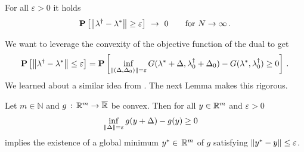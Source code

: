\begin{theorem}
  \label{bw:cd:th}
  For all
  $\varepsilon>0$ it holds
  \begin{gather}
    \P
    \left[ 
    \norm{
      \lambda^\dagger
      -
      \lambda^*
    }
    \ge
    \varepsilon
    \right]
    \ 
    \to
    \ 
    0
    \qquad
    \text{for}\ 
    N
    \to 
    \infty
    \,.
  \end{gather}
\end{theorem}
We want to leverage the convexity of
the objective function of the dual to get
 \begin{gather*}
   \mathbf{P}
   \left[ 
     \left\lVert
      \lambda ^ \dagger
      -
      \lambda^*
     \right\rVert
     \le
     \varepsilon
   \right]
   =
   \mathbf{P}
   \left[ 
     \inf _ { 
       \left\lVert
         (
     \Delta
     ,
     \Delta_0
         )
 \right\rVert 
= \varepsilon }
     G
     (
     \lambda^*
      +
      \Delta
      ,
      \lambda^\dagger_0
      +
     \Delta_0
     )
     -
     G
     (
     \lambda^*,
      \lambda^\dagger_0
     )
     \ge 
     0
   \right]
   \,.
 \end{gather*}
We learned about a similar idea from \cite[p.22]{Wang2019}. The next Lemma makes this rigorous. 
\begin{lemma}
  \label{bw:cd:lem}
  Let $m\in\mathbb{N}$ and
  $g \,:\, \mathbb{R}^m \to \overline{\mathbb{R}}$ 
  be convex.
  Then 
  for all $y \in \mathbb{R}^m$ and $\varepsilon>0$ 
    \begin{gather}
      \label{7060_0}
      \inf_{\left\lVert\Delta\right\rVert=\varepsilon} g(y+\Delta) - g(y) \ge 0 \quad
    \end{gather}
    implies
    the existence of  
    a global minimum
    $
    y^* \in \,\mathbb{R}^m
    $
    of $g$
    satisfying
    $
      \left\lVert y^* - y\right\rVert \le \varepsilon
    $.
\end{lemma}
